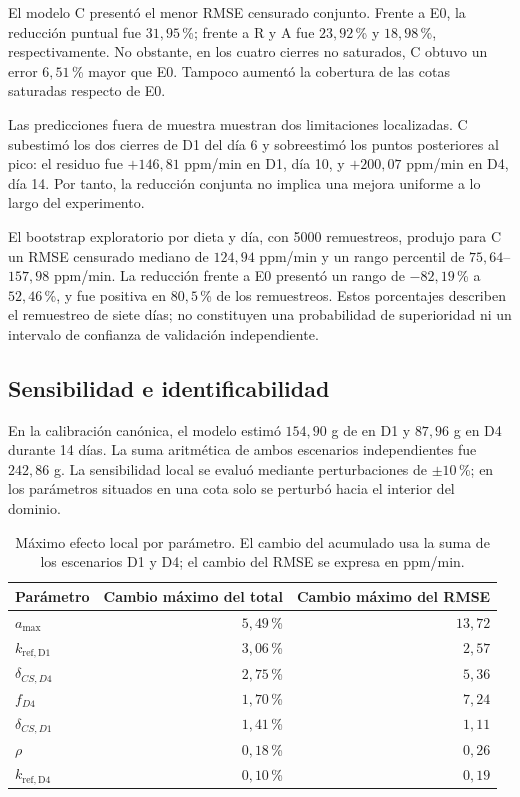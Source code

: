 El modelo C presentó el menor RMSE censurado conjunto. Frente a E0, la
reducción puntual fue $31{,}95$\,\%; frente a R y A fue $23{,}92$\,\% y
$18{,}98$\,\%, respectivamente. No obstante, en los cuatro cierres no
saturados, C obtuvo un error $6{,}51$\,\% mayor que E0. Tampoco aumentó la
cobertura de las cotas saturadas respecto de E0.

Las predicciones fuera de muestra muestran dos limitaciones localizadas.
C subestimó los dos cierres de D1 del día 6 y sobreestimó los puntos
posteriores al pico: el residuo fue $+146{,}81$ ppm/min en D1, día 10, y
$+200{,}07$ ppm/min en D4, día 14. Por tanto, la reducción conjunta no
implica una mejora uniforme a lo largo del experimento.

El bootstrap exploratorio por dieta y día, con 5000 remuestreos, produjo
para C un RMSE censurado mediano de $124{,}94$ ppm/min y un rango percentil
de $75{,}64$--$157{,}98$ ppm/min. La reducción frente a E0 presentó un
rango de $-82{,}19$\,\% a $52{,}46$\,\%, y fue positiva en $80{,}5$\,\% de
los remuestreos. Estos porcentajes describen el remuestreo de siete días;
no constituyen una probabilidad de superioridad ni un intervalo de
confianza de validación independiente.

\subsection{Sensibilidad e identificabilidad}

En la calibración canónica, el modelo estimó $154{,}90$ g de \co{} en D1 y
$87{,}96$ g en D4 durante 14 días. La suma aritmética de ambos escenarios
independientes fue $242{,}86$ g. La sensibilidad local se evaluó mediante
perturbaciones de $\pm10$\,\%; en los parámetros situados en una cota solo
se perturbó hacia el interior del dominio.

\begin{table}[H]
\centering
\small
\caption{Máximo efecto local por parámetro. El cambio del acumulado usa la
suma de los escenarios D1 y D4; el cambio del RMSE se expresa en ppm/min.}
\begin{tabular}{l r r}
\toprule
Parámetro & Cambio máximo del \co{} total & Cambio máximo del RMSE \\
\midrule
$a_{\max}$       & $5{,}49$\,\% & $13{,}72$ \\
$k_{\mathrm{ref,D1}}$ & $3{,}06$\,\% & $2{,}57$ \\
$\delta_{CS,D4}$ & $2{,}75$\,\% & $5{,}36$ \\
$f_{D4}$         & $1{,}70$\,\% & $7{,}24$ \\
$\delta_{CS,D1}$ & $1{,}41$\,\% & $1{,}11$ \\
$\rho$           & $0{,}18$\,\% & $0{,}26$ \\
$k_{\mathrm{ref,D4}}$ & $0{,}10$\,\% & $0{,}19$ \\
\bottomrule
\end{tabular}
\label{tab:sensibilidad_local}
\end{table}

